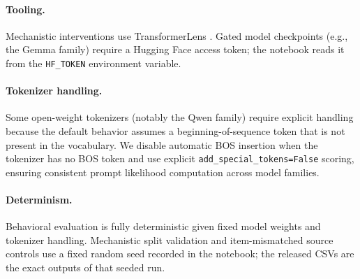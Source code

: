 \documentclass[11pt]{article}
\begin{document}
\paragraph{Tooling.}
Mechanistic interventions use TransformerLens \citep{nanda2022transformerlens}. Gated model
checkpoints (e.g., the Gemma family) require a Hugging Face access token; the notebook reads
it from the \texttt{HF\_TOKEN} environment variable.

\paragraph{Tokenizer handling.}
Some open-weight tokenizers (notably the Qwen family) require explicit handling because the
default behavior assumes a beginning-of-sequence token that is not present in the vocabulary.
We disable automatic BOS insertion when the tokenizer has no BOS token and use explicit
\texttt{add\_special\_tokens=False} scoring, ensuring consistent prompt likelihood computation
across model families.

\paragraph{Determinism.}
Behavioral evaluation is fully deterministic given fixed model weights and tokenizer handling.
Mechanistic split validation and item-mismatched source controls use a fixed random seed
recorded in the notebook; the released CSVs are the exact outputs of that seeded run.
\end{document}
